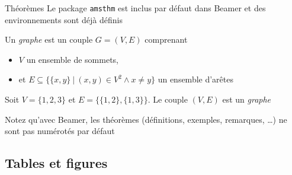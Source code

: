 \documentclass[french]{beamer}
\begin{document}
  \begin{frame}[fragile]{Théorèmes}
    Le package \verb!amsthm! est inclus par défaut dans Beamer et des environnements sont déjà définis
    
      \begin{definition}[Graphe]
        Un \emph{graphe} est un couple $G = (V, E)$ comprenant
        \begin{itemize}
          \item $V$ un ensemble de sommets, 
          \item et $E \subseteq \{\{x, y\}\ |\ (x, y) \in V^2 \wedge x \neq y\}$ un ensemble d'arêtes
        \end{itemize}
      \end{definition}
      
      \begin{example}
        Soit $V = \{1, 2, 3\}$ et $E = \{\{1, 2\}, \{1, 3\}\}$. Le couple $(V, E)$ est un \emph{graphe}
      \end{example}
      
      \begin{remark}
        Notez qu'avec Beamer, les théorèmes (définitions, exemples, remarques, \dots) ne sont pas numérotés par défaut
      \end{remark}
  \end{frame}
  
  \subsection{Tables et figures}
  
\end{document}
